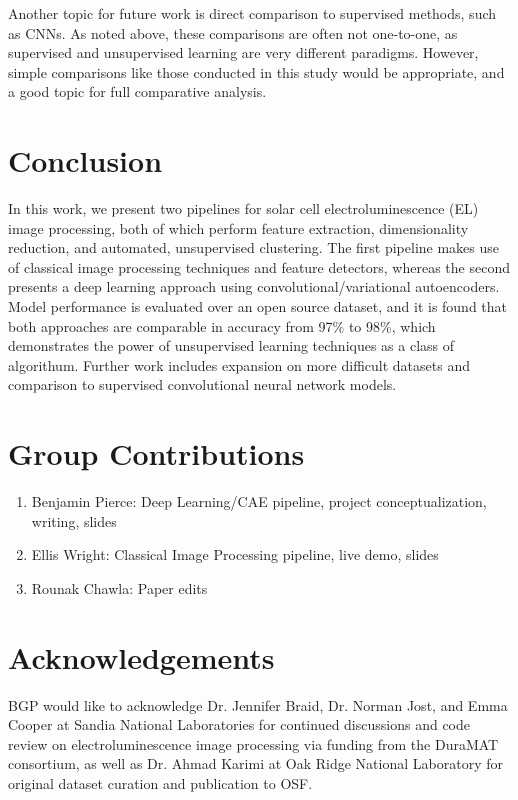 \documentclass[conference]{IEEEtran}
\begin{document}
Another topic for future work is direct comparison to supervised methods, such as CNNs. 
As noted above, these comparisons are often not one-to-one, as supervised and unsupervised learning are very different paradigms. 
However, simple comparisons like those conducted in this study would be appropriate, and a good topic for full comparative analysis. 


\section{Conclusion}
In this work, we present two pipelines for solar cell electroluminescence (EL) image processing, both of which perform feature extraction, dimensionality reduction, and automated, unsupervised clustering. 
The first pipeline makes use of classical image processing techniques and feature detectors, whereas the second presents a deep learning approach using convolutional/variational autoencoders. 
Model performance is evaluated over an open source dataset, and it is found that both approaches are comparable in accuracy from 97\% to 98\%, which demonstrates the power of unsupervised learning techniques as a class of algorithum. 
Further work includes expansion on more difficult datasets and comparison to supervised convolutional neural network models. 

\section{Group Contributions}
\begin{enumerate}
    \item Benjamin Pierce: Deep Learning/CAE pipeline, project conceptualization, writing, slides
    \item Ellis Wright: Classical Image Processing pipeline, live demo, slides
    \item Rounak Chawla: Paper edits
\end{enumerate}

\section{Acknowledgements}
BGP would like to acknowledge Dr. Jennifer Braid, Dr. Norman Jost, and Emma Cooper at Sandia National Laboratories for continued discussions and code review on electroluminescence image processing via funding from the DuraMAT consortium, as well as Dr. Ahmad Karimi at Oak Ridge National Laboratory for original dataset curation and publication to OSF. 
\end{document}
